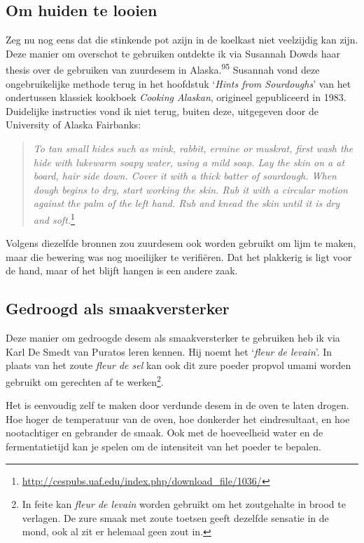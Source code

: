 \documentclass[
  11pt,
  dutch,
]{memoir}
\begin{document}
\hypertarget{om-huiden-te-looien}{%
\subsection{Om huiden te looien}\label{om-huiden-te-looien}}

Zeg nu nog eens dat die stinkende pot azijn in de koelkast niet
veelzijdig kan zijn. Deze manier om overschot te gebruiken ontdekte ik
via Susannah Dowds haar thesis over de gebruiken van zuurdesem in
Alaska.\textsuperscript{95} Susannah vond deze ongebruikelijke methode
terug in het hoofdstuk `\emph{Hints from Sourdoughs}' van het
ondertussen klassiek kookboek \emph{Cooking Alaskan}, origineel
gepubliceerd in 1983. Duidelijke instructies vond ik niet terug, buiten
deze, uitgegeven door de University of Alaska Fairbanks:

\begin{quote}
\emph{To tan small hides such as mink, rabbit, ermine or muskrat, first
wash the hide with lukewarm soapy water, using a mild soap. Lay the skin
on a at board, hair side down. Cover it with a thick batter of
sourdough. When dough begins to dry, start working the skin. Rub it with
a circular motion against the palm of the left hand. Rub and knead the
skin until it is dry and soft.}\footnote{\url{http://cespubs.uaf.edu/index.php/download_file/1036/}}
\end{quote}

Volgens diezelfde bronnen zou zuurdesem ook worden gebruikt om lijm te
maken, maar die bewering was nog moeilijker te verifiëren. Dat het
plakkerig is ligt voor de hand, maar of het blijft hangen is een andere
zaak.

\hypertarget{gedroogd-als-smaakversterker}{%
\subsection{Gedroogd als
smaakversterker}\label{gedroogd-als-smaakversterker}}

Deze manier om gedroogde desem als smaakversterker te gebruiken heb ik
via Karl De Smedt van Puratos leren kennen. Hij noemt het `\emph{fleur
de levain}'. In plaats van het zoute \emph{fleur de sel} kan ook dit
zure poeder propvol umami worden gebruikt om gerechten af te
werken\footnote{In feite kan \emph{fleur de levain} worden gebruikt om
  het zoutgehalte in brood te verlagen. De zure smaak met zoute toetsen
  geeft dezelfde sensatie in de mond, ook al zit er helemaal geen zout
  in.}.

Het is eenvoudig zelf te maken door verdunde desem in de oven te laten
drogen. Hoe hoger de temperatuur van de oven, hoe donkerder het
eindresultaat, en hoe nootachtiger en gebrander de smaak. Ook met de
hoeveelheid water en de fermentatietijd kan je spelen om de intensiteit
van het poeder te bepalen.
\end{document}
